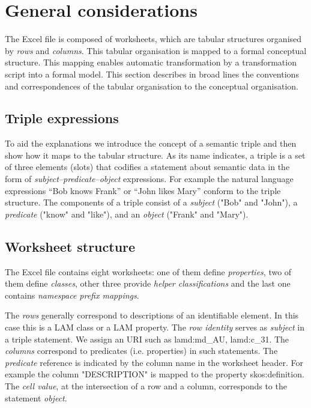 \section{General considerations}

%

The Excel file is composed of worksheets, which are tabular structures organised by \textit{rows} and \textit{columns}. This tabular organisation is mapped to a formal conceptual structure. This mapping enables automatic transformation by a transformation script into a formal model. This section describes in broad lines the conventions and correspondences of the tabular organisation to the conceptual organisation.

\subsection{Triple expressions}

To aid the explanations we introduce the concept of a semantic triple and then show how it maps to the tabular structure. As its name indicates, a triple is a set of three elements (slots) that codifies a statement about semantic data in the form of \textit{subject–predicate–object} expressions. For example the natural language expressions ``Bob knows Frank'' or ``John likes Mary'' conform to the triple structure. The components of a triple consist of a \textit{subject} ("Bob" and "John"), a \textit{predicate}  ("know" and "like"), and an \textit{object} ("Frank" and "Mary").

\subsection{Worksheet structure}

The Excel file contains eight worksheets: one of them define \textit{properties}, two of them define \textit{classes}, other three provide \textit{helper classifications} and the last one contains \textit{namespace prefix mappings}.

The \textit{rows} generally correspond to descriptions of an identifiable element. In this case this is a LAM class or a LAM property. The \textit{row identity} serves as \textit{subject} in a triple statement. We assign an URI such as lamd:md\_AU, lamd:c\_31. The \textit{columns} correspond to predicates (i.e. properties) in such statements. The \textit{predicate} reference is indicated by the column name in the worksheet header. For example the column "DESCRIPTION" is mapped to the property skos:definition. The \textit{cell value}, at the intersection of a row and a column, corresponds to the statement \textit{object}.

